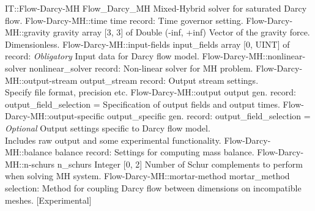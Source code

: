 \begin{RecordType}
	{IT::Flow-Darcy-MH}
	{Flow{\_}Darcy{\_}MH}
	{}%
	{}%
	{{{Mixed-Hybrid  solver for saturated Darcy flow.}%
}}
		\RecKey
			{Flow-Darcy-MH::time}
			{time}
			{{record: }}{}
			{ \ValueDefault{{\{}{\}}}}
			{{{Time governor setting.}%
}}
		\RecKey
			{Flow-Darcy-MH::gravity}
			{gravity}
			{{array [3, 3] of }{Double (-inf, +inf)}}{}
			{ \ValueDefault{[0, 0, -1]}}
			{{{Vector of the gravity force.
Dimensionless.}%
}}
		\RecKey
			{Flow-Darcy-MH::input-fields}
			{input{\_}fields}
			{{array [0, UINT] of }{record: }}{}
			{ \it{Obligatory}}
			{{{Input data for Darcy flow model.}%
}}
		\RecKey
			{Flow-Darcy-MH::nonlinear-solver}
			{nonlinear{\_}solver}
			{{record: }}{}
			{ \ValueDefault{{\{}{\}}}}
			{{{Non-linear solver for MH problem.}%
}}
		\RecKey
			{Flow-Darcy-MH::output-stream}
			{output{\_}stream}
			{{record: }}{}
			{ \ValueDefault{{\{}{\}}}}
			{{{Output stream settings.}\\{
 Specify file format, precision etc.}%
}}
		\RecKey
			{Flow-Darcy-MH::output}
			{output}
			{{gen. record: }}{{output{\_}field{\_}selection}{ = }}
			{ }
			{{{Specification of output fields and output times.}%
}}
		\RecKey
			{Flow-Darcy-MH::output-specific}
			{output{\_}specific}
			{{gen. record: }}{{output{\_}field{\_}selection}{ = }}
			{ \it{Optional}}
			{{{Output settings specific to Darcy flow model.}\\{
Includes raw output and some experimental functionality.}%
}}
		\RecKey
			{Flow-Darcy-MH::balance}
			{balance}
			{{record: }}{}
			{ \ValueDefault{{\{}{\}}}}
			{{{Settings for computing mass balance.}%
}}
		\RecKey
			{Flow-Darcy-MH::n-schurs}
			{n{\_}schurs}
			{{Integer [0, 2]}}{}
			{ }
			{{{Number of Schur complements to perform when solving MH system.}%
}}
		\RecKey
			{Flow-Darcy-MH::mortar-method}
			{mortar{\_}method}
			{{selection: }}{}
			{ }
			{{{Method for coupling Darcy flow between dimensions on incompatible meshes. [Experimental]}%
}}
\end{RecordType}

